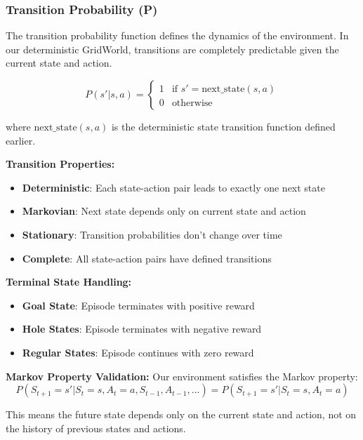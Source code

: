 \documentclass[12pt]{article}
\begin{document}
{{{\subsubsection{Transition Probability (P)}

The transition probability function defines the dynamics of the environment. In our deterministic GridWorld, transitions are completely predictable given the current state and action.

\begin{equation}
P(s'|s, a) = \begin{cases}
1 & \text{if } s' = \text{next\_state}(s, a) \\
0 & \text{otherwise}
\end{cases}
\end{equation}

where $\text{next\_state}(s, a)$ is the deterministic state transition function defined earlier.

\textbf{Transition Properties:}
\begin{itemize}
    \item \textbf{Deterministic}: Each state-action pair leads to exactly one next state
    \item \textbf{Markovian}: Next state depends only on current state and action
    \item \textbf{Stationary}: Transition probabilities don't change over time
    \item \textbf{Complete}: All state-action pairs have defined transitions
\end{itemize}

\textbf{Terminal State Handling:}
\begin{itemize}
    \item \textbf{Goal State}: Episode terminates with positive reward
    \item \textbf{Hole States}: Episode terminates with negative reward
    \item \textbf{Regular States}: Episode continues with zero reward
\end{itemize}

\textbf{Markov Property Validation:}
Our environment satisfies the Markov property:
\begin{equation}
P(S_{t+1} = s' | S_t = s, A_t = a, S_{t-1}, A_{t-1}, ...) = P(S_{t+1} = s' | S_t = s, A_t = a)
\end{equation}

This means the future state depends only on the current state and action, not on the history of previous states and actions.

}}}
\end{document}
